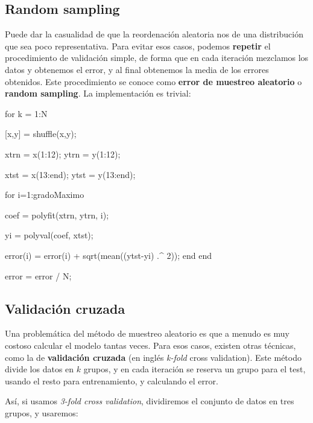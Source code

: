 \documentclass[11pt]{scrartcl}
\begin{document}
\subsection{Random sampling}

Puede dar la casualidad de que la reordenación aleatoria nos de una distribución
que sea poco representativa. Para evitar esos casos, podemos \textbf{repetir} el
procedimiento de validación simple, de forma que en cada iteración mezclamos los
datos y obtenemos el error, y al final obtenemos la media de los errores
obtenidos. Este procedimiento se conoce como \textbf{error de muestreo
  aleatorio} o \textbf{random sampling}. La implementación es trivial:

\begin{matlabcode}
for k = 1:N

    [x,y] = shuffle(x,y);

    xtrn = x(1:12); 
    ytrn = y(1:12);

    xtst = x(13:end); 
    ytst = y(13:end);    

    for i=1:gradoMaximo

        coef = polyfit(xtrn, ytrn, i);    

        yi = polyval(coef, xtst);

        error(i) = error(i) + sqrt(mean((ytst-yi) .^ 2));
    end   
end

error = error / N;  
\end{matlabcode}

\subsection{Validación cruzada}

Una problemática del método de muestreo aleatorio es que a menudo es muy costoso
calcular el modelo tantas veces. Para esos casos, existen otras técnicas, como
la de \textbf{validación cruzada} (en inglés \textit{k-fold} cross
validation). Este método divide los datos en $k$ grupos, y en cada iteración se
reserva un grupo para el test, usando el resto para entrenamiento, y calculando
el error.

Así, si usamos \textit{3-fold cross validation}, dividiremos el conjunto de
datos en tres grupos, y usaremos:
\end{document}
